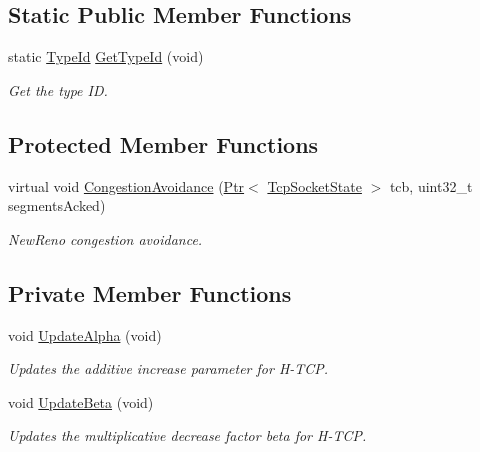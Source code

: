 \subsection*{Static Public Member Functions}
\begin{DoxyCompactItemize}
\item 
static \hyperlink{classns3_1_1TypeId}{Type\+Id} \hyperlink{classns3_1_1TcpHtcp_a5c56fbdce06774bbe720b02528c2400f}{Get\+Type\+Id} (void)
\begin{DoxyCompactList}\small\item\em Get the type ID. \end{DoxyCompactList}\end{DoxyCompactItemize}
\subsection*{Protected Member Functions}
\begin{DoxyCompactItemize}
\item 
virtual void \hyperlink{classns3_1_1TcpHtcp_a5eb471eacd7966cf548024c3870cc3bf}{Congestion\+Avoidance} (\hyperlink{classns3_1_1Ptr}{Ptr}$<$ \hyperlink{classns3_1_1TcpSocketState}{Tcp\+Socket\+State} $>$ tcb, uint32\+\_\+t segments\+Acked)
\begin{DoxyCompactList}\small\item\em New\+Reno congestion avoidance. \end{DoxyCompactList}\end{DoxyCompactItemize}
\subsection*{Private Member Functions}
\begin{DoxyCompactItemize}
\item 
void \hyperlink{classns3_1_1TcpHtcp_a2eefc9a29bf9747095c705066de9c7a3}{Update\+Alpha} (void)
\begin{DoxyCompactList}\small\item\em Updates the additive increase parameter for H-\/\+T\+CP. \end{DoxyCompactList}\item 
void \hyperlink{classns3_1_1TcpHtcp_a839688dcc8178d960f750d62ca375602}{Update\+Beta} (void)
\begin{DoxyCompactList}\small\item\em Updates the multiplicative decrease factor beta for H-\/\+T\+CP. \end{DoxyCompactList}\end{DoxyCompactItemize}
